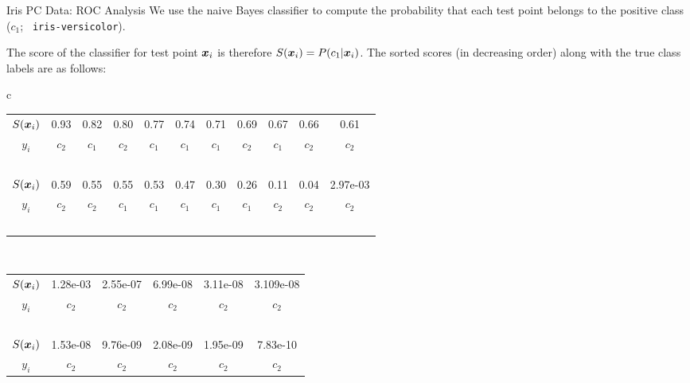 \begin{frame}{Iris PC Data: ROC Analysis}
We use the naive Bayes
  classif\/{i}er to compute the probability that each
  test point belongs to the positive class ($c_1$; {\tt
  iris-versicolor}). 
  
  \medskip
  The score of the classif\/{i}er for test point ${\boldsymbol x}_i$
  is therefore $S({\boldsymbol x}_i) = P(c_1 | {\boldsymbol x}_i)$.
  The sorted scores (in decreasing order)
  along with the true
  class labels are as follows:

  \begin{center}
  \footnotesize
\begin{tabular}{c}
    \renewcommand{\arraystretch}{1.1}\begin{tabular}{|c|cccccccccc|}
    \hline
$S({\boldsymbol x}_i)$ & 0.93 & 0.82 & 0.80 & 0.77 & 0.74 & 0.71 & 0.69 & 0.67 & 0.66 & 0.61\\
$y_i$ & $c_2$    &$c_1$    &  $c_2$   & $c_1$   & $c_1$   &$c_1$    &
$c_2$   &
$c_1$   & $c_2$    & $c_2$\\
\hline
\multicolumn{11}{c}{~}\\
\hline
$S({\boldsymbol x}_i)$ & 0.59 &
0.55 &
0.55 &
0.53 &
0.47 &
0.30 &
0.26 &
0.11 &
0.04 &
2.97e-03\\
$y_i$ & $c_2$ & $c_2$& $c_1$& $c_1$& $c_1$& $c_1$& $c_1$&  $c_2$&
$c_2$&  $c_2$\\
\hline
\multicolumn{11}{c}{~}\\
\end{tabular}\\
\renewcommand{\arraystretch}{1.1}\begin{tabular}{|c|ccccc|}
\hline
$S({\boldsymbol x}_i)$& 1.28e-03 &
2.55e-07 &
6.99e-08 &
3.11e-08 &
3.109e-08\\
$y_i$ & $c_2$ & $c_2$ & $c_2$ & $c_2$ & $c_2$\\
\hline
\multicolumn{6}{c}{~}\\
\hline
$S({\boldsymbol x}_i)$& 1.53e-08 &
9.76e-09 &
2.08e-09 &
1.95e-09 &
7.83e-10 \\
$y_i$ & $c_2$ & $c_2$ & $c_2$ & $c_2$ & $c_2$\\
\hline
  \end{tabular}\\
\end{tabular}%
\end{center}
\end{frame}



